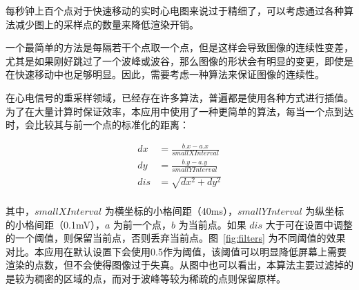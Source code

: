 每秒钟上百个点对于快速移动的实时心电图来说过于精细了，可以考虑通过各种算法减少图上的采样点的数量来降低渲染开销。

一个最简单的方法是每隔若干个点取一个点，但是这样会导致图像的连续性变差，尤其是如果刚好跳过了一个波峰或波谷，那么图像的形状会有明显的变更，即使是在快速移动中也足够明显。因此，需要考虑一种算法来保证图像的连续性。

在心电信号的重采样领域，已经存在许多算法，普遍都是使用各种方式进行插值。为了在大量计算时保证效率，本应用中使用了一种更简单的算法，每当一个点到达时，会比较其与前一个点的标准化的距离：

\begin{align*}
    dx  &= \frac{b.x - a.x}{smallXInterval} \\
    dy  &= \frac{b.y - a.y}{smallYInterval} \\
    dis &= \sqrt{dx^2 + dy^2} \\
\end{align*}

其中，\(smallXInterval\) 为横坐标的小格间距（40ms），\(smallYInterval\) 为纵坐标的小格间距（0.1mV），\(a\) 为前一个点，\(b\) 为当前点。如果 \(dis\) 大于可在设置中调整的一个阈值，则保留当前点，否则丢弃当前点。图~\ref{fig:filters} 为不同阈值的效果对比。本应用在默认设置下会使用0.5作为阈值，该阈值可以明显降低屏幕上需要渲染的点数，但不会使得图像过于失真。从图中也可以看出，本算法主要过滤掉的是较为稠密的区域的点，而对于波峰等较为稀疏的点则保留原样。

